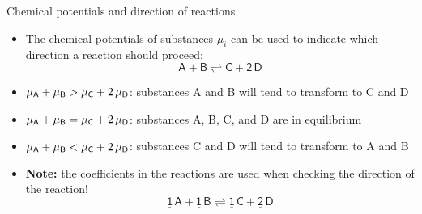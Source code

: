 %
%
\begin{frame}{Chemical potentials and direction of reactions}

\begin{itemize}[<+->]
\item The chemical potentials of substances $\mu_{i}$ can be used to
indicate which direction a reaction should proceed: 
\[
\mathsf{A+B\rightleftharpoons C+2\,D}
\]
\item $\mu_{\sf A}+\mu_{\sf B}>\mu_{\sf C}+2\,\mu_{\sf D}$: substances A and B will
tend to transform to C and D
\item $\mu_{\sf A}+\mu_{\sf B}=\mu_{\sf C}+2\,\mu_{\sf D}$: substances A, B, C,
and D are in equilibrium 
\item $\mu_{\sf A}+\mu_{\sf B}<\mu_{\sf C}+2\,\mu_{\sf D}$: substances C and D will
tend to transform to A and B
\item \alert{\bf Note:} the coefficients in the reactions are used
when checking the direction of the reaction!
\[
\mathsf{\underline{1}\,A+\underline{1}\,B\rightleftharpoons\underline{1}\,C+\underline{2}\,D}
\]
\end{itemize}
\end{frame}
%
%
